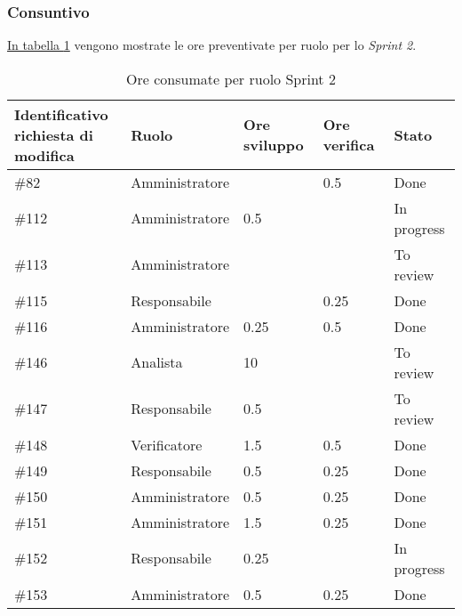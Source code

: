 \subsubsection{Consuntivo}

\hyperref[tab:sprint2_ore_consumate]{In tabella \ref{tab:sprint2_ore_consumate}} vengono mostrate le ore preventivate per ruolo per lo \textit{Sprint 2}.

\begin{table}[H]
    \centering
    \begin{tabular}{| l | l | l | l | l |}
        \hline
                \makecell{\textbf{Identificativo} \\ \textbf{richiesta di modifica}} &
                \textbf{Ruolo} & 
                \textbf{Ore sviluppo} &
                \textbf{Ore verifica} & 
                \textbf{Stato}\\ 
    \hline
        \#82 & Amministratore &  & 0.5 & Done \\
    \hline
        \#112 & Amministratore & 0.5 &  & In progress \\
    \hline
        \#113 & Amministratore &  &  & To review \\
    \hline
        \#115 & Responsabile &  & 0.25 & Done \\
    \hline
        \#116 & Amministratore & 0.25 & 0.5 & Done \\
    \hline
        \#146 & Analista & 10 &  & To review \\
    \hline
        \#147 & Responsabile & 0.5 & & To review \\
    \hline
        \#148 & Verificatore & 1.5 & 0.5 & Done \\
    \hline
        \#149 & Responsabile & 0.5 & 0.25 & Done \\
    \hline
        \#150 & Amministratore & 0.5 & 0.25 & Done \\
     \hline
        \#151 & Amministratore & 1.5 & 0.25 & Done \\
    \hline
        \#152 & Responsabile & 0.25 &  & In progress \\
    \hline
        \#153 & Amministratore& 0.5 & 0.25 & Done \\
    \hline
    \end{tabular}
    \caption{Ore consumate per ruolo Sprint 2}
    \label{tab:sprint2_ore_consumate} 
\end{table}